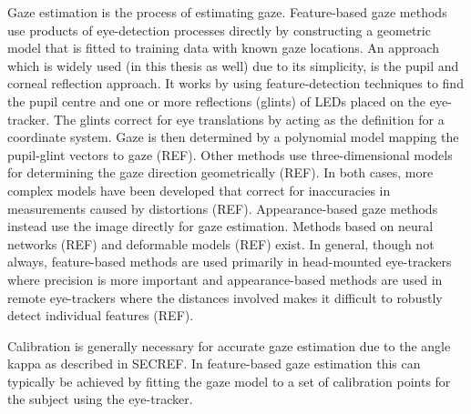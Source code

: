 Gaze estimation is the process of estimating gaze. Feature-based gaze methods use products of eye-detection processes directly by constructing a geometric model that is fitted to training data with known gaze locations. An approach which is widely used (in this thesis as well) due to its simplicity, is the pupil and corneal reflection approach. It works by using feature-detection techniques to find the pupil centre and one or more reflections (glints) of LEDs placed on the eye-tracker. The glints correct for eye translations by acting as the definition for a coordinate system. Gaze is then determined by a polynomial model mapping the pupil-glint vectors to gaze (REF). Other methods use three-dimensional models for determining the gaze direction geometrically (REF). In both cases, more complex models have been developed that correct for inaccuracies in measurements caused by distortions (REF). Appearance-based gaze methods instead use the image directly for gaze estimation. Methods based on neural networks (REF) and deformable models (REF) exist. In general, though not always, feature-based methods are used primarily in head-mounted eye-trackers where precision is more important and appearance-based methods are used in remote eye-trackers where the distances involved makes it difficult to robustly detect individual features (REF).

Calibration is generally necessary for accurate gaze estimation due to the angle kappa as described in SECREF. In feature-based gaze estimation this can typically be achieved by fitting the gaze model to a set of calibration points for the subject using the eye-tracker.





